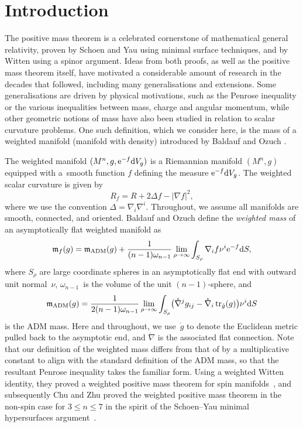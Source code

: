 \documentclass[pdftex]{sigma}
\numberwithin{equation}{section}
\theoremstyle{definition}
\begin{document}
\section{Introduction}
The positive mass theorem is a celebrated cornerstone of mathematical general relativity, proven by Schoen and Yau \cite{SchoenYau79} using minimal surface techniques, and by Witten \cite{Witten81} using a spinor argument. Ideas from both proofs, as well as the positive mass theorem itself, have motivated a considerable amount of research in the decades that followed, including many generalisations and extensions. Some generalisations are driven by physical motivations, such as the Penrose inequality or the various inequalities between mass, charge and angular momentum, while other geometric notions of mass have also been studied in relation to scalar curvature problems. One such definition, which we consider here, is the mass of a weighted manifold (manifold with density) introduced by Baldauf and Ozuch \cite{BaldaufOzuch22}.

The weighted manifold $(M^n,g,{\rm e}^{-f}{\rm d}V_g)$ is a Riemannian manifold $(M^n,g)$ equipped with a~smooth function $f$ defining the measure ${\rm e}^{-f}{\rm d}V_g$. The weighted scalar curvature is given by
\[
	R_f = R + 2\Delta f - |\nabla f|^2,
\]
where we use the convention $\Delta=\nabla_i \nabla^i$. Throughout, we assume all manifolds are smooth, connected, and oriented. Baldauf and Ozuch define the \emph{weighted mass} of an asymptotically flat weighted manifold as
\begin{equation*}%
	\mathfrak{m}_f(g) = \mathfrak{m}_{\rm ADM}(g)  +  \frac{1}{(n-1) \omega_{n-1}}\lim_{\rho\to\infty}\int_{S_\rho} \nabla_i f \nu^i {\rm e}^{-f} {\rm d}S,
\end{equation*}
where $S_\rho$ are large coordinate spheres in an asymptotically flat end with outward unit normal~$\nu$, $\omega_{n-1}$~is the volume of the unit $(n-1)$-sphere, and
\begin{equation*}%
	\mathfrak{m}_{\rm ADM}(g)=\frac{1}{2(n-1) \omega_{n-1}}\lim_{\rho\to\infty}\int_{S_\rho} \bigl( \mathring{\nabla}^jg_{ij}-\mathring{\nabla}_i\operatorname{tr}_{\mathring g}(g)\bigr) \nu^i{\rm d}S
\end{equation*}
is the ADM mass. Here and throughout, we use~$\mathring g$ to denote the Euclidean metric pulled back to the asymptotic end, and $\mathring\nabla$ is the associated flat connection. Note that our definition of the weighted mass differs from that of \cite{BaldaufOzuch22} by a multiplicative constant to align with the standard definition of the ADM mass, so that the resultant Penrose inequality takes the familiar form. Using a weighted Witten identity, they proved a weighted positive mass theorem for spin manifolds~\cite{BaldaufOzuch22}, and subsequently Chu and Zhu proved the weighted positive mass theorem in the non-spin case for $3\le n\le 7$ in the spirit of the Schoen--Yau minimal hypersurfaces argument~\cite{ChuZhu24}.
\end{document}
